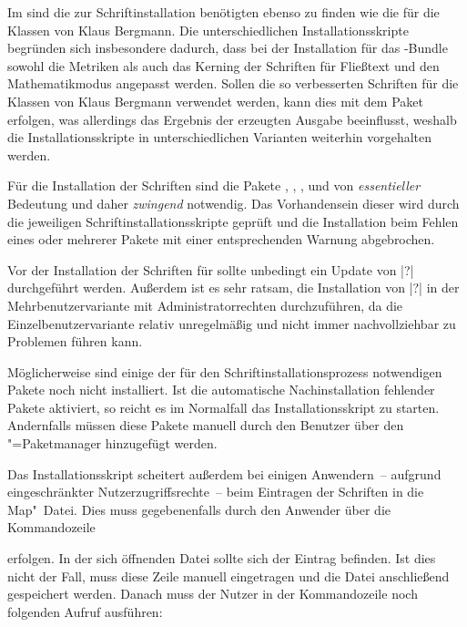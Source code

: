 Im \GitHubRepo* sind die zur Schriftinstallation benötigten 
ebenso zu finden wie die
für die Klassen von Klaus Bergmann. Die unterschiedlichen Installationsskripte 
begründen sich insbesondere dadurch, dass bei der Installation für das 
\TUDScript-Bundle sowohl die Metriken als auch das Kerning der Schriften für 
Fließtext und den Mathematikmodus angepasst werden. Sollen die so verbesserten 
Schriften für die Klassen von Klaus Bergmann verwendet werden, kann dies mit 
dem Paket  erfolgen, was allerdings das Ergebnis der 
erzeugten Ausgabe beeinflusst, weshalb die Installationsskripte in 
unterschiedlichen Varianten weiterhin vorgehalten werden.

Für die Installation der Schriften sind die Pakete , 
, ,  und 
 von \emph{essentieller} Bedeutung und daher \emph{zwingend} 
notwendig. Das Vorhandensein dieser wird durch die jeweiligen 
Schriftinstallationsskripte geprüft und die Installation beim Fehlen eines oder 
mehrerer Pakete mit einer entsprechenden Warnung abgebrochen.

Vor der Installation der Schriften für \TUDScript sollte unbedingt ein Update 
von |?| durchgeführt werden. Außerdem ist es sehr 
ratsam, die Installation von |?| in der 
Mehrbenutzervariante mit Administratorrechten durchzuführen, da die 
Einzelbenutzervariante relativ unregelmäßig und nicht immer nachvollziehbar zu 
Problemen führen kann. 

Möglicherweise sind einige der für den Schriftinstallationsprozess notwendigen 
Pakete noch nicht installiert. Ist die automatische Nachinstallation fehlender 
Pakete aktiviert, so reicht es im Normalfall das Installationsskript zu 
starten. Andernfalls müssen diese Pakete manuell durch den Benutzer über den 
"=Paketmanager hinzugefügt werden.

Das Installationsskript scheitert außerdem bei einigen Anwendern~-- aufgrund 
eingeschränkter Nutzerzugriffsrechte~-- beim Eintragen der Schriften in die 
Map"~Datei. Dies muss gegebenenfalls durch den Anwender über die Kommandozeile 
%
\begin{quoting}
\end{quoting}
%
erfolgen. In der sich öffnenden Datei sollte sich der Eintrag 
 befinden. Ist dies nicht der Fall, muss diese Zeile 
manuell eingetragen und die Datei anschließend gespeichert werden. Danach muss 
der Nutzer in der Kommandozeile noch folgenden Aufruf ausführen:
%
\begin{quoting}
\end{quoting}


